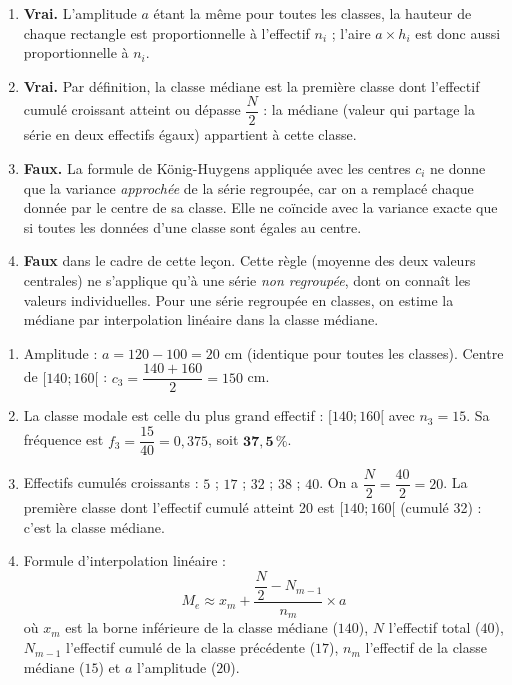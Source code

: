 \documentclass[11pt]{article}
\newcommand{\cle}[1]{{\popxbold\color{popdark}#1}}
\begin{document}
\begin{corrige}
\begin{enumerate}
    \item \textbf{Vrai.} L'amplitude $a$ étant la même pour toutes les classes, la hauteur de chaque rectangle est proportionnelle à l'effectif $n_i$ ; l'aire $a \times h_i$ est donc aussi proportionnelle à $n_i$.
    \item \textbf{Vrai.} Par définition, la \cle{classe médiane} est la première classe dont l'effectif cumulé croissant atteint ou dépasse $\dfrac{N}{2}$ : la médiane (valeur qui partage la série en deux effectifs égaux) appartient à cette classe.
    \item \textbf{Faux.} La formule de König-Huygens appliquée avec les centres $c_i$ ne donne que la variance \emph{approchée} de la série regroupée, car on a remplacé chaque donnée par le centre de sa classe. Elle ne coïncide avec la variance exacte que si toutes les données d'une classe sont égales au centre.
    \item \textbf{Faux} dans le cadre de cette leçon. Cette règle (moyenne des deux valeurs centrales) ne s'applique qu'à une série \emph{non regroupée}, dont on connaît les valeurs individuelles. Pour une série regroupée en classes, on estime la médiane par \cle{interpolation linéaire} dans la classe médiane.
\end{enumerate}
\end{corrige}

\begin{corrige}
\begin{enumerate}
    \item Amplitude : $a = 120-100 = 20$ cm (identique pour toutes les classes). Centre de $[140;160[$ : $c_3 = \dfrac{140+160}{2} = 150$ cm.
    \item La \cle{classe modale} est celle du plus grand effectif : $[140;160[$ avec $n_3 = 15$. Sa fréquence est $f_3 = \dfrac{15}{40} = 0{,}375$, soit $\mathbf{37{,}5\,\%}$.
    \item Effectifs cumulés croissants : $5$ ; $17$ ; $32$ ; $38$ ; $40$. On a $\dfrac{N}{2} = \dfrac{40}{2} = 20$. La première classe dont l'effectif cumulé atteint 20 est $[140;160[$ (cumulé 32) : c'est la \cle{classe médiane}.
    \item Formule d'interpolation linéaire :
    \[ M_e \approx x_m + \frac{\dfrac{N}{2} - N_{m-1}}{n_m}\times a \]
    où $x_m$ est la borne inférieure de la classe médiane ($140$), $N$ l'effectif total ($40$), $N_{m-1}$ l'effectif cumulé de la classe précédente ($17$), $n_m$ l'effectif de la classe médiane ($15$) et $a$ l'amplitude ($20$).
\end{enumerate}
\end{corrige}
\end{document}
